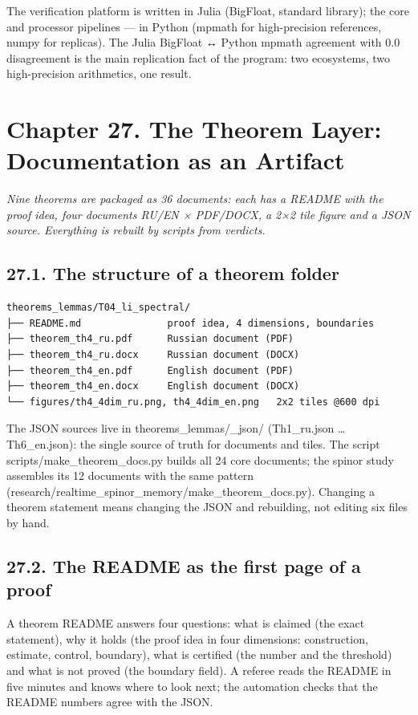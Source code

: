 \documentclass[11pt,a4paper]{article}
\begin{document}
The verification platform is written in Julia (BigFloat, standard library); the core and processor pipelines — in Python (mpmath for high-precision references, numpy for replicas). The Julia BigFloat ↔ Python mpmath agreement with 0.0 disagreement is the main replication fact of the program: two ecosystems, two high-precision arithmetics, one result.

\section{Chapter 27. The Theorem Layer: Documentation as an Artifact}

\noindent\textit{\color{copper}Nine theorems are packaged as 36 documents: each has a README with the proof idea, four documents RU/EN × PDF/DOCX, a 2×2 tile figure and a JSON source. Everything is rebuilt by scripts from verdicts.}

\subsection{27.1. The structure of a theorem folder}

\begin{verbatim}
theorems_lemmas/T04_li_spectral/
├── README.md               proof idea, 4 dimensions, boundaries
├── theorem_th4_ru.pdf      Russian document (PDF)
├── theorem_th4_ru.docx     Russian document (DOCX)
├── theorem_th4_en.pdf      English document (PDF)
├── theorem_th4_en.docx     English document (DOCX)
└── figures/th4_4dim_ru.png, th4_4dim_en.png   2x2 tiles @600 dpi
\end{verbatim}

The JSON sources live in theorems\_lemmas/\_json/ (Th1\_ru.json … Th6\_en.json): the single source of truth for documents and tiles. The script scripts/make\_theorem\_docs.py builds all 24 core documents; the spinor study assembles its 12 documents with the same pattern (research/realtime\_spinor\_memory/make\_theorem\_docs.py). Changing a theorem statement means changing the JSON and rebuilding, not editing six files by hand.

\subsection{27.2. The README as the first page of a proof}

A theorem README answers four questions: what is claimed (the exact statement), why it holds (the proof idea in four dimensions: construction, estimate, control, boundary), what is certified (the number and the threshold) and what is not proved (the boundary field). A referee reads the README in five minutes and knows where to look next; the automation checks that the README numbers agree with the JSON.
\end{document}

